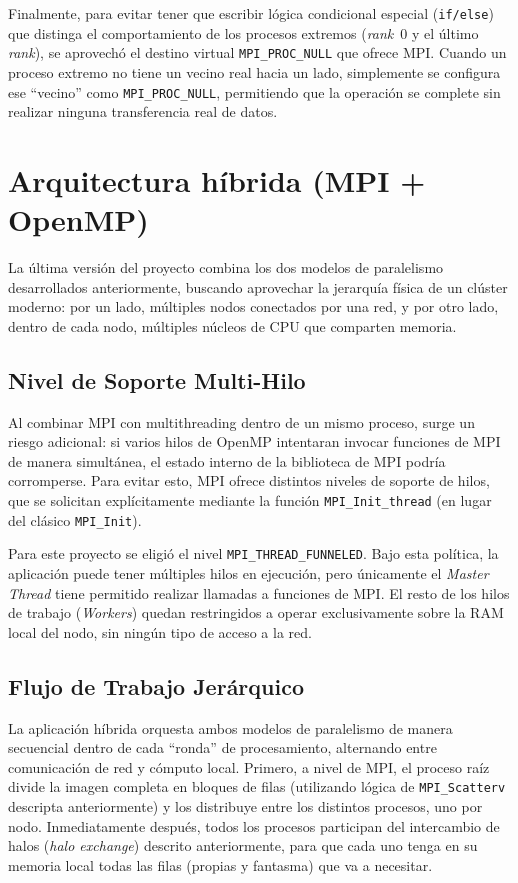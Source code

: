 Finalmente, para evitar tener que escribir lógica condicional especial (\texttt{if/else}) que distinga el comportamiento de los procesos extremos (\textit{rank}~0 y el último \textit{rank}), se aprovechó el destino virtual \texttt{MPI\_PROC\_NULL} que ofrece MPI. Cuando un proceso extremo no tiene un vecino real hacia un lado, simplemente se configura ese ``vecino'' como \texttt{MPI\_PROC\_NULL}, permitiendo que la operación se complete sin realizar ninguna transferencia real de datos.


\section{Arquitectura híbrida (MPI + OpenMP)}

La última versión del proyecto combina los dos modelos de paralelismo desarrollados anteriormente, buscando aprovechar la jerarquía física de un clúster moderno: por un lado, múltiples nodos conectados por una red, y por otro lado, dentro de cada nodo, múltiples núcleos de CPU que comparten memoria.


\subsection{Nivel de Soporte Multi-Hilo}

Al combinar MPI con multithreading dentro de un mismo proceso, surge un riesgo adicional: si varios hilos de OpenMP intentaran invocar funciones de MPI de manera simultánea, el estado interno de la biblioteca de MPI podría corromperse. Para evitar esto, MPI ofrece distintos niveles de soporte de hilos, que se solicitan explícitamente mediante la función \texttt{MPI\_Init\_thread} (en lugar del clásico \texttt{MPI\_Init}).

Para este proyecto se eligió el nivel \texttt{MPI\_THREAD\_FUNNELED}. Bajo esta política, la aplicación puede tener múltiples hilos en ejecución, pero únicamente el \textit{Master Thread} tiene permitido realizar llamadas a funciones de MPI. El resto de los hilos de trabajo (\textit{Workers}) quedan restringidos a operar exclusivamente sobre la RAM local del nodo, sin ningún tipo de acceso a la red.


\subsection{Flujo de Trabajo Jerárquico}

La aplicación híbrida orquesta ambos modelos de paralelismo de manera secuencial dentro de cada ``ronda'' de procesamiento, alternando entre comunicación de red y cómputo local. Primero, a nivel de MPI, el proceso raíz divide la imagen completa en bloques de filas (utilizando lógica de \texttt{MPI\_Scatterv} descripta anteriormente) y los distribuye entre los distintos procesos, uno por nodo. Inmediatamente después, todos los procesos participan del intercambio de halos (\textit{halo exchange}) descrito anteriormente, para que cada uno tenga en su memoria local todas las filas (propias y fantasma) que va a necesitar.

